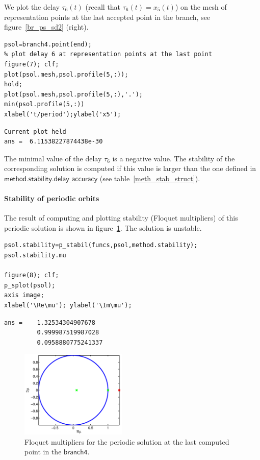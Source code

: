 \documentclass[10pt]{scrartcl}
\newcommand{\parm}[1]{\mathsf{#1}}
\begin{document}
We plot the delay $\tau_6(t)$ (recall that $\tau_6(t)=x_5(t)$)
on the mesh of representation points at the last accepted point 
in the branch, see figure~\ref{br_ps_sd2} (right).
\begin{lstlisting}
psol=branch4.point(end);
% plot delay 6 at representation points at the last point
figure(7); clf;
plot(psol.mesh,psol.profile(5,:));
hold;
plot(psol.mesh,psol.profile(5,:),'.');
min(psol.profile(5,:))
xlabel('t/period');ylabel('x5');  
\end{lstlisting}
{\small
\begin{verbatim}
Current plot held
ans =  6.11538227874438e-30
\end{verbatim}}
The minimal value of the delay $\tau_6$ is a negative value. 
The stability of the corresponding solution is computed if this 
value is larger 
than the one defined in $\parm{method.stability.delay\_accuracy}$
(see table~\ref{meth_stab_struct}).

\paragraph{Stability of periodic orbits}
The result of computing and plotting stability (Floquet multipliers) 
of this periodic solution is shown in 
figure~\ref{sd_dde_mu}. The solution is unstable.
\begin{lstlisting}
psol.stability=p_stabil(funcs,psol,method.stability);
psol.stability.mu

figure(8); clf;
p_splot(psol);
axis image;
xlabel('\Re\mu'); ylabel('\Im\mu');  
\end{lstlisting}
{\small
\begin{verbatim}
ans =    1.32534304907678
         0.999987519987028
         0.0958880775241337
\end{verbatim}}
\begin{figure}[h]
  \begin{center}
    \includegraphics[width=0.45\textwidth]{fig/sdd8}
  \end{center}
  \caption{\label{sd_dde_mu}Floquet multipliers for the periodic 
    solution at the last computed point in the $\parm{branch4}$.} 
\end{figure}
\end{document}
